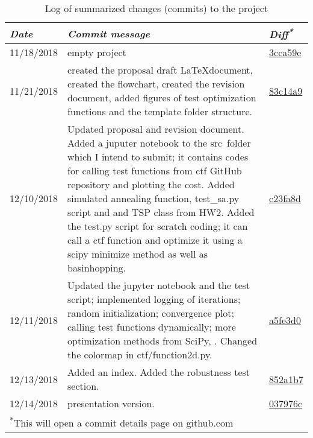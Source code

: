 \documentclass[conference]{IEEEtran}
\begin{document}
\begin{table}[htbp]
\caption{Log of summarized changes (commits) to the project}
\begin{center}
\begin{tabular}{|p{2cm}|p{12cm}|p{1.5cm}|}
\hline
\textbf{\textit{Date}} & \textbf{\textit{Commit message}} & \textbf{\textit{Diff\textsuperscript{*}}} \\
\hline
11/18/2018 & empty project & \href{https://github.com/esalman/optimization_project/commit/3cca59ef96b87e23606e25f05718cc9657fb858e}{3cca59e} \\
\hline
11/21/2018 & created the proposal draft \LaTeX document, created the flowchart, created the revision document, added figures of test optimization functions and the template folder structure. & \href{https://github.com/esalman/optimization_project/commit/83c14a986cda7649bbc1ff77555dc8fd7c02e4c4}{83c14a9} \\
\hline
12/10/2018 & Updated proposal and revision document. Added a juputer notebook to the src\ folder which I intend to submit; it contains codes for calling test functions from ctf GitHub repository and plotting the cost. Added simulated annealing function, test\_sa.py script and and TSP class from HW2. Added the test.py script for scratch coding; it can call a ctf function and optimize it using a scipy minimize method as well as basinhopping. & \href{https://github.com/esalman/optimization_project/commit/c23fa8db4d18c7f6ce1c8946b786170ca853978f}{c23fa8d} \\
\hline
12/11/2018 & Updated the jupyter notebook and the test script; implemented logging of iterations; random initialization; convergence plot; calling test functions dynamically; more optimization methods from SciPy, . Changed the colormap in ctf/function2d.py. & \href{https://github.com/esalman/optimization_project/commit/a5fe3d08482de397b2a694dfb6aa4ad98b6085b3}{a5fe3d0} \\
\hline
12/13/2018 & Added an index. Added the robustness test section. & \href{https://github.com/esalman/optimization_project/commit/852a1b722d405c19475e2a2727c7b5c13f886662}{852a1b7} \\
\hline
12/14/2018 & presentation version. & \href{https://github.com/esalman/optimization_project/commit/037976c6d05a9f4cab8553827e10f0f0bedb9864}{037976c} \\
\hline
\multicolumn{3}{l}{\textsuperscript{*}This will open a commit details page on github.com}
\end{tabular}
\label{tab1}
\end{center}
\end{table}
\end{document}
